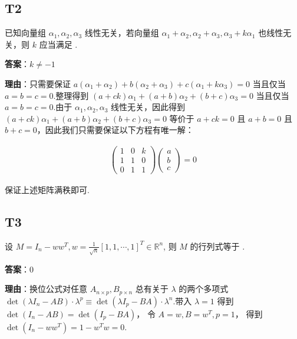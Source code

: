 \documentclass{article}
\begin{document}
\subsection{T2}

\par 已知向量组 $\alpha_1, \alpha_2, \alpha_3$ 线性无关，若向量组 $\alpha_1+\alpha_2, \alpha_2+\alpha_3, \alpha_3+k\alpha_1$ 也线性无关，则 $k$ 应当满足 \underline{\phantom{empty\_space}}.

\par \textbf{答案}：$k\neq -1$

\par \textbf{理由}：只需要保证 $a(\alpha_1+\alpha_2) + b(\alpha_2+\alpha_3)+c(\alpha_1+k\alpha_3)=0$ 当且仅当 $a=b=c=0$.整理得到 $(a+ck)\alpha_1 + (a+b)\alpha_2 + (b+c)\alpha_3=0$ 当且仅当 $a=b=c=0$.由于 $\alpha_1, \alpha_2, \alpha_3$ 线性无关，因此得到 $(a+ck)\alpha_1 + (a+b)\alpha_2 + (b+c)\alpha_3=0$ 等价于 $a+ck=0$ 且 $a+b=0$ 且 $b+c=0$，因此我们只需要保证以下方程有唯一解：

\begin{align*}
	\begin{pmatrix}
		1 & 0 & k\\
		1 & 1 & 0\\
		0 & 1 & 1
	\end{pmatrix} \begin{pmatrix}
		a\\b\\c
	\end{pmatrix}=0
\end{align*}

保证上述矩阵满秩即可.

\subsection{T3}

\par 设 $M=I_n - ww^T, w=\frac{1}{\sqrt n}[ 1, 1, \cdots, 1]^T \in \mathbb R^n$, 则 $M$ 的行列式等于 \underline{\phantom{empty\_space}}.

\par \textbf{答案}：0

\par \textbf{理由}：换位公式对任意 $A_{n\times p}, B_{p\times n}$ 总有关于 $\lambda$ 的两个多项式 $\det(\lambda I_n - AB) \cdot \lambda^p \equiv \det(\lambda I_p - BA) \cdot \lambda^n $.带入 $\lambda = 1$ 得到 $\det(I_n - AB) = \det(I_p - BA)$， 令 $A=w, B=w^T, p=1$， 得到 $\det(I_n - ww^T)=1 - w^Tw=0$.
\end{document}
